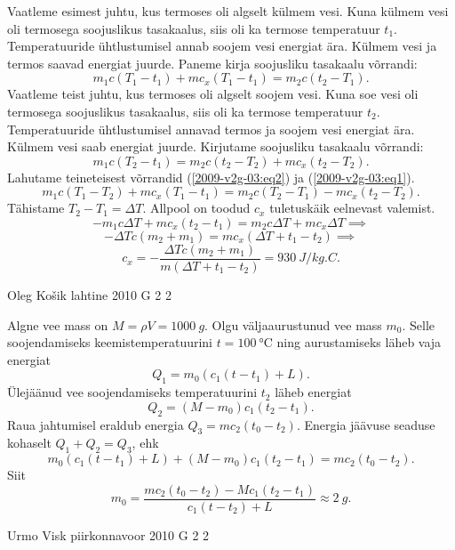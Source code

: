 \documentclass[11pt, twoside]{article}
\begin{document}
{{Vaatleme esimest juhtu, kus termoses oli algselt külmem vesi. Kuna külmem vesi oli termosega soojuslikus tasakaalus, siis oli ka termose temperatuur $t_1$. Temperatuuride
ühtlustumisel annab soojem vesi energiat ära. Külmem vesi ja termos saavad energiat juurde. Paneme kirja soojusliku tasakaalu võrrandi:
\begin{equation}
m_{1} c\left(T_{1}-t_{1}\right)+m c_{x}\left(T_{1}-t_{1}\right)=m_{2} c\left(t_{2}-T_{1}\right).
\label{2009-v2g-03:eq1}
\end{equation}
Vaatleme teist juhtu, kus termoses oli algselt soojem vesi. Kuna soe vesi oli termosega soojuslikus tasakaalus, siis oli ka termose temperatuur $t_2$. Temperatuuride
ühtlustumisel annavad termos ja soojem vesi energiat ära. Külmem vesi saab energiat juurde. Kirjutame soojusliku tasakaalu võrrandi:
\begin{equation}
m_{1} c\left(T_{2}-t_{1}\right)=m_{2} c\left(t_{2}-T_{2}\right)+m c_{x}\left(t_{2}-T_{2}\right).
\label{2009-v2g-03:eq2}
\end{equation}
Lahutame teineteisest võrrandid (\ref{2009-v2g-03:eq2}) ja (\ref{2009-v2g-03:eq1}).
\[
m_{1} c\left(T_{1}-T_{2}\right)+m c_{x}\left(T_{1}-t_{1}\right)=m_{2} c\left(T_{2}-T_{1}\right)-m c_{x}\left(t_{2}-T_{2}\right).
\]
Tähistame $T_2 - T_1 = \Delta T$. Allpool on toodud $c_x$ tuletuskäik eelnevast valemist.
\[
-m_{1} c \Delta T+m c_{x}\left(t_{2}-t_{1}\right)=m_{2} c \Delta T+m c_{x} \Delta T\implies
\]
\[
-\Delta T c\left(m_{2}+m_{1}\right)=m c_{x}\left(\Delta T+t_{1}-t_{2}\right)\implies
\]
\[
c_{x}=-\frac{\Delta T c\left(m_{2}+m_{1}\right)}{m\left(\Delta T+t_{1}-t_{2}\right)}=\SI{930}{J/kg.C}.
\]
\fi
}

{Oleg Košik} %
{lahtine} %
{2010} %
{G 2} %
{2} %
{

\ifSolution
Algne vee mass on $M=\rho V=\SI{1000}{g}$. Olgu väljaaurustunud vee mass $m_0$. Selle soojendamiseks keemistemperatuurini $t=\SI{100}{\celsius}$ ning aurustamiseks läheb vaja energiat
\[
Q_1=m_0(c_1(t-t_1)+L).
\]
Ülejäänud vee soojendamiseks temperatuurini $t_2$ läheb energiat
\[
Q_2=(M-m_0)c_1(t_2-t_1).
\]
Raua jahtumisel eraldub energia $Q_3=mc_2(t_0-t_2)$. Energia jäävuse seaduse kohaselt $Q_1+Q_2=Q_3$, ehk
\[
m_0(c_1(t-t_1)+L)+(M-m_0)c_1(t_2-t_1)=mc_2(t_0-t_2).
\]
Siit
\[
m_0=\frac{mc_2(t_0-t_2)-Mc_1(t_2-t_1)}{c_1(t-t_2)+L}\approx \SI{2}{g}.
\]
\fi
}

{Urmo Visk} %
{piirkonnavoor} %
{2010} %
{G 2} %
{2} %
{

}}
\end{document}
